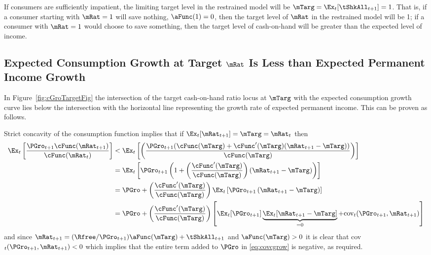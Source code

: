 \documentclass[BufferStockTheory]{subfiles}
\begin{document}
If consumers are sufficiently impatient, the limiting target level in the
restrained model will be $\mTarg = \Ex_{t}[{\tShkAll}_{t+1}] = 1$. That
is, if a consumer starting with $\mRat = 1$ will save nothing, ${\aFunc}(1)=0$,
then the target level of $\mRat$ in the restrained model will be 1; if a
consumer with $\mRat=1$ would choose to save something, then the target
level of cash-on-hand will be greater than the expected level of income.

\hypertarget{cGroLTpGro}{}
\subsection{Expected Consumption Growth at Target $\mRat$ Is Less than
  Expected Permanent Income Growth}

\label{subsec:expcgrowth} In Figure~\ref{fig:cGroTargetFig} the intersection of
the target cash-on-hand ratio locus at $\mTarg$ with the expected consumption
growth curve lies below the intersection with the horizontal line
representing the growth rate of expected permanent income. This can be
proven as follows.

Strict concavity of the consumption function implies that if $\Ex_{t}[{\mRat}_{t+1}] = \mTarg = \mRat_{t}$ then
\begin{align}
  \Ex_{t}\left[\frac{{\PGro}_{t+1} \cFunc({\mRat}_{t+1})}{\cFunc(\mRat_{t})}
  \right]  & < \Ex_{t}\left[\left(\frac{{\PGro}_{t+1}
             (\cFunc(\mTarg)+\cFunc^{\prime}(\mTarg)({\mRat}_{t+1}-\mTarg))}{\cFunc(\mTarg)}\right)\right]  \nonumber \\
           & = \Ex_{t}\left[{\PGro}_{t+1} \left(1+\left(\frac{\cFunc^{\prime}(\mTarg)}{%
             \cFunc(\mTarg)}\right)({\mRat}_{t+1}-\mTarg)\right)\right]  \nonumber  \\
           & = \PGro + \left(\frac{\cFunc^{\prime}(\mTarg)}{\cFunc(\mTarg)}\right)\Ex_{t}\left[ {\PGro}_{t+1}\left({\mRat}_{t+1}-\mTarg\right)\right]  \nonumber \\
           & = \PGro + \left(\frac{\cFunc^{\prime}(\mTarg)}{\cFunc(\mTarg)}\right)\left[
             \Ex_{t}[ \PGro_{t+1}]\underbrace{\Ex_{t}[
             {\mRat}_{t+1}-\mTarg]}_{=0}+\mbox{cov}_{t}( {\PGro}_{t+1},{\mRat}_{t+1})\right]
             \label{eq:covcgrow}
\end{align}
and since $\mRat_{t+1} = (\Rfree/\PGro_{t+1}) \aFunc(\mTarg)+\tShkAll_{t+1}$ and
$\aFunc(\mTarg)>0$ it is clear that
cov$_{t}({\PGro}_{t+1},{\mRat}_{t+1})<0$ which implies that
the entire term added to $\PGro$ in \eqref{eq:covcgrow} is negative, as
required.
\end{document}
